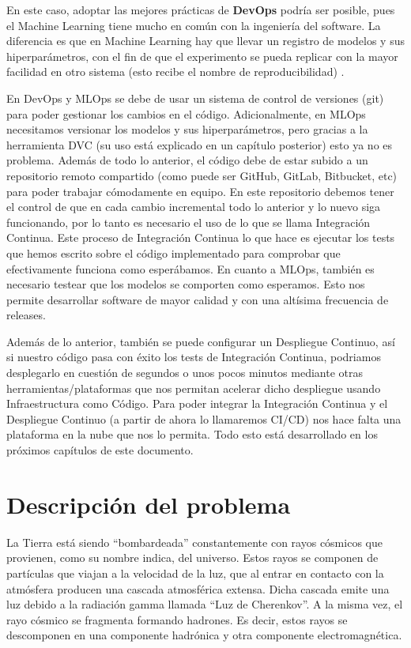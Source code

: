 En este caso, adoptar las mejores prácticas de \textbf{DevOps} podría ser posible, pues el Machine Learning tiene mucho en común con la ingeniería del software. La diferencia es que en Machine Learning hay que llevar un registro de modelos y sus hiperparámetros, con el fin de que el experimento se pueda replicar con la mayor facilidad en otro sistema (esto recibe el nombre de reproducibilidad) \cite{whymlops}.\newline

En DevOps y MLOps se debe de usar un sistema de control de versiones (git) para poder gestionar los cambios en el código. Adicionalmente, en MLOps necesitamos versionar los modelos y sus hiperparámetros, pero gracias a la herramienta DVC (su uso está explicado en un capítulo posterior) esto ya no es problema. Además de todo lo anterior, el código debe de estar subido a un repositorio remoto compartido (como puede ser GitHub, GitLab, Bitbucket, etc) para poder trabajar cómodamente en equipo. En este repositorio debemos tener el control de que en cada cambio incremental todo lo anterior y lo nuevo siga funcionando, por lo tanto es necesario el uso de lo que se llama Integración Continua. Este proceso de Integración Continua lo que hace es ejecutar los tests que hemos escrito sobre el código implementado para comprobar que efectivamente funciona como esperábamos. En cuanto a MLOps, también es necesario testear que los modelos se comporten como esperamos. Esto nos permite desarrollar software de mayor calidad y con una altísima frecuencia de releases.\newline

Además de lo anterior, también se puede configurar un Despliegue Continuo, así si nuestro código pasa con éxito los tests de Integración Continua, podriamos desplegarlo en cuestión de segundos o unos pocos minutos mediante otras herramientas/plataformas que nos permitan acelerar dicho despliegue usando Infraestructura como Código. Para poder integrar la Integración Continua y el Despliegue Continuo (a partir de ahora lo llamaremos CI/CD) nos hace falta una plataforma en la nube que nos lo permita. Todo esto está desarrollado en los próximos capítulos de este documento.

\section{Descripción del problema}

La Tierra está siendo \enquote{bombardeada} constantemente con rayos cósmicos que provienen, como su nombre indica, del universo. Estos rayos se componen de partículas que viajan a la velocidad de la luz, que al entrar en contacto con la atmósfera producen una cascada atmosférica extensa. Dicha cascada emite una luz debido a la radiación gamma llamada \enquote{Luz de Cherenkov}. A la misma vez, el rayo cósmico se fragmenta formando hadrones. Es decir, estos rayos se descomponen en una componente hadrónica y otra componente electromagnética.\newline

